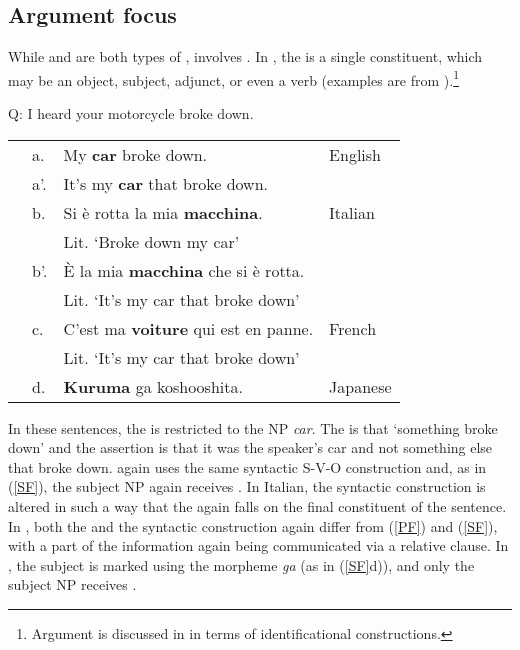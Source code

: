 \subsection{Argument focus}\label{afsection}

While  and  are both types of ,  involves . In , the  is a single constituent, which may be an object, subject, adjunct, or even a verb (examples are from \citealt{lambrecht1994}).\footnote{Argument  is discussed in  in terms of identificational constructions.}


\ea\label{AF}
{Q: I heard your motorcycle broke down.} \\
\begin{table} 
\begin{tabular}{l l l l}
 & a. & {My \textbf{car} broke down}. & {English} \\
 & a'. & {It's my \textbf{car} that broke down}. \\
 & b. & {Si \`{e} rotta la mia \textbf{macchina}}. & {Italian} \\
  & & Lit. `Broke down my car' \\
   & b'. & {\`{E} la mia \textbf{macchina} che si \`{e} rotta}. \\
     & & Lit. `It's my car that broke down' \\
 & c. & {C'est ma \textbf{voiture} qui est en panne}. & {French} \\
  & & Lit. `It's my car that broke down'  \\
   & d. & {\textbf{Kuruma} ga koshooshita}.  & {Japanese} \\
\end{tabular}
\end{table}
\z

In these sentences, the  is restricted to the NP \textit{car}. The  is that `something broke down' and the assertion is that it was the speaker's car and not something else that broke down.  again uses the same syntactic S-V-O construction and, as in (\ref{SF}), the subject NP again receives . In Italian, the syntactic construction is altered in such a way that the  again falls on the final constituent of the sentence. In , both the  and the syntactic construction again differ from (\ref{PF}) and (\ref{SF}), with a part of the information again being communicated via a relative clause. In , the subject is marked using the morpheme \textit{ga} (as in (\ref{SF}d)), and only the subject NP receives .

